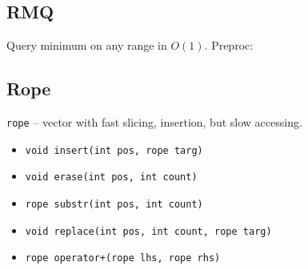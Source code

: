 \subsection{RMQ}

Query minimum on any range in $O(1)$. Preproc: 

\subsection{Rope}

\verb|rope| -- vector with fast slicing, insertion, but slow accessing.

\begin{itemize}
    \item \verb|void insert(int pos, rope targ)|
    \item \verb|void erase(int pos, int count)|
    \item \verb|rope substr(int pos, int count)|
    \item \verb|void replace(int pos, int count, rope targ)|
    \item \verb|rope operator+(rope lhs, rope rhs)|
\end{itemize}